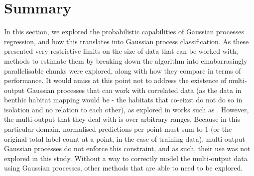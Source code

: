 

\section{Summary}

In this section, we explored the probabilistic capabilities of Gaussian processes regression, and how this translates into Gaussian process classification. As these presented very restrictive limits on the size of data that can be worked with, methods to estimate them by breaking down the algorithm into emabarrasingly parallelisable chunks were explored, along with how they compare in terms of performance. It would amiss at this point not to address the existence of multi-output Gaussian processes that can work with correlated data (as the data in benthic habitat mapping would be - the habitats that co-eixst do not do so in isolation and no relation to each other), as explored in works such as . However, the multi-output that they deal with is over arbitrary ranges. Because in this particular domain, normalised predictions per point must sum to $1$ (or the original total label count at a point, in the case of training data), multi-output Gaussian processes do not enforce this constraint, and as such, their use was not explored in this study. Without a way to correctly model the multi-output data using Gaussian processes, other methods that are able to need to be explored.
